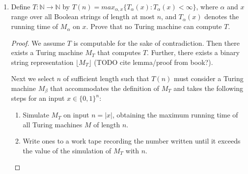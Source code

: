 \documentclass[usletter]{article}
\begin{document}
\begin{enumerate}
\begin{proof}
      That is, we must show there exists a Turing machine $M_h$ that computes $\lfloor f(|x|) + g(|x|) \rfloor$ in $O(f(n) + g(n))$.

      We know the following:

      \begin{itemize}
        \item There exists a Turing machine $M_f$ that computes $\lfloor f(|x|) \rfloor$ in $O(f(n))$ by the definition of time-constructibility in \cite{textbook, 16} and lecture.

        \item There exists a Turing machine $M_g$ that computes $\lfloor g(|x|) \rfloor$ in $O(g(n))$.

        \item Either $f = O(g)$, $g = O(f)$ or $f = \Theta(g)$ for sufficiently large $|x|$. That is, the runtime of either $M_f$ or $M_g$ is $\Theta(h(n))$.
      \end{itemize}

      As a result we know that $M_h$ exists.
    \end{proof}

    \begin{proof} (b)
      We must show that following $h : \mathbb{N} \rightarrow \mathbb{N}$ is time-constructible.

      \begin{align*}
        h(n) &= f(n) \cdot g(n)
      \end{align*}
    \end{proof}


  \item Define $T : \mathbb{N} \rightarrow \mathbb{N}$ by $T(n) = max_{\alpha,x}\{T_{\alpha}(x) : T_{\alpha}(x) < \infty \}$, where $\alpha$ and $x$ range over all Boolean strings of length at most $n$, and $T_{\alpha}(x)$ denotes the running time of $M_{\alpha}$ on $x$. Prove that no Turing machine can compute $T$.

    \begin{proof}
      We assume $T$ is computable for the sake of contradiction. Then there exists a Turing machine $M_T$ that computes $T$. Further, there exists a binary string representation $\lfloor M_T \rfloor$ (TODO cite lemma/proof from book?).

      Next we select $n$ of sufficient length such that $T(n)$ must consider a Turing machine $M_{\beta}$ that accommodates the definition of $M_T$ and takes the following steps for an input $x \in \{0,1\}^n$:
      \begin{enumerate}
        \item Simulate $M_T$ on input $n = |x|$, obtaining the maximum running time of all Turing machines $M$ of length $n$.
        \item Write ones to a work tape recording the number written until it exceeds the value of the simulation of $M_T$ with $n$.
      \end{enumerate}


\end{proof}
\end{enumerate}
\end{document}
